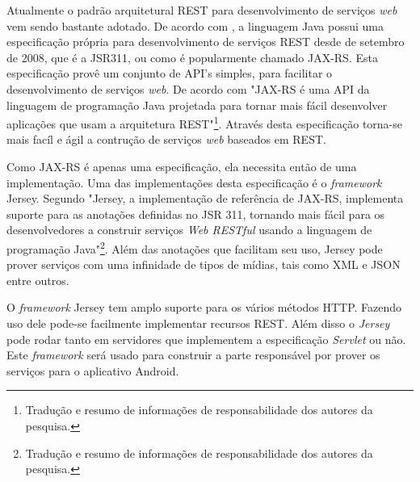 
	\par Atualmente o padrão arquitetural REST para desenvolvimento de serviços
\textit{web} vem sendo bastante adotado. De acordo com
, a linguagem Java possui uma especificação
própria para desenvolvimento de serviços REST desde de setembro de 2008, que é
a JSR311, ou como é popularmente chamado JAX-RS. Esta especificação provê um
conjunto de API's simples, para facilitar o desenvolvimento de serviços
\textit{web}. De acordo com  "JAX-RS é uma API da
linguagem de programação Java projetada para tornar mais fácil
desenvolver aplicações que usam a arquitetura REST"\footnote{Tradução e resumo
de informações de responsabilidade dos autores da pesquisa.}. Através desta
especificação torna-se mais facíl e ágil a contrução de serviços \textit{web}
baseados em REST.

	\par Como JAX-RS é apenas uma especificação, ela necessita então de uma
implementação. Uma das implementações desta especificação é o
\textit{framework} Jersey. Segundo  "Jersey, a
implementação de referência de JAX-RS, implementa suporte para as anotações
definidas no JSR 311, tornando mais fácil para os desenvolvedores a construir
serviços \textit{Web RESTful} usando a linguagem de programação
Java"\footnote{Tradução e resumo de informações de responsabilidade
dos autores da pesquisa.}. Além das anotações que facilitam seu uso,
Jersey pode prover serviços com uma infinidade de tipos de
mídias, tais como XML e JSON entre outros.

	\par O \textit{framework} Jersey tem amplo suporte para os vários métodos
HTTP. Fazendo uso dele pode-se facilmente implementar recursos REST. Além
disso o \textit{Jersey}  pode rodar tanto em servidores que implementem a
especificação \textit{Servlet} ou não. Este \textit{framework} será usado para
construir a parte responsável por prover os serviços para o aplicativo
Android.

